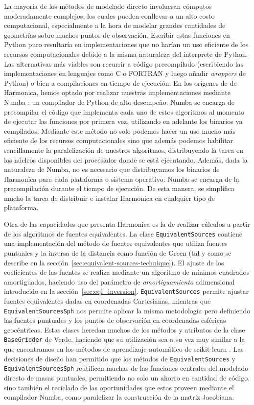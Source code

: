La mayoría de los métodos de modelado directo involucran cómputos moderadamente
complejos, los cuales pueden conllevar a un alto costo computacional,
especialmente a la hora de modelar grandes cantidades de geometrías sobre
muchos puntos de observación.
Escribir estas funciones en Python puro resultaría en implementaciones que no
harían un uso eficiente de los recursos computacionales debido a la misma
naturaleza del interprete de Python.
Las alternativas más viables son recurrir a código precompilado (escribiendo
las implementaciones en lenguajes como C o FORTRAN y luego añadir
\emph{wrappers} de Python) o bien a compilaciones en tiempo de ejecución.
En los orígenes de de Harmonica, hemos optado por realizar nuestras
implementaciones mediante Numba \citep{numba2015}: un compilador de Python de
alto desempeño.
Numba se encarga de precompilar el código que implementa cada uno de estos
algoritmos al momento de ejecutar las funciones por primera vez, utilizando en
adelante los binarios ya compilados.
Mediante este método no solo podemos hacer un uso mucho más eficiente de los
recursos computacionales sino que además podemos habilitar sencillamente la
paralelización de nuestros algoritmos, distribuyendo la tarea en los
núcleos disponibles del procesador donde se está ejecutando.
Además, dada la naturaleza de Numba, no es necesario que distribuyamos los
binarios de Harmonica para cada plataforma o sistema operativo: Numba se
encarga de la precompilación durante el tiempo de ejecución.
De esta manera, se simplifica mucho la tarea de distribuir e instalar
Harmonica en cualquier tipo de plataforma.

Otra de las capacidades que presenta Harmonica es la de realizar cálculos
a partir de los algoritmos de fuentes equivalentes.
La clase \texttt{EquivalentSources} contiene una implementación del método de
fuentes equivalentes que utiliza fuentes puntuales y la inversa de la distancia
como función de Green (tal y como se describe en la
sección~\ref{sec:equivalent-sources-technique}).
El ajuste de los coeficientes de las fuentes se realiza mediante un algoritmo
de mínimos cuadrados amortiguados, haciendo uso del parámetro de
\emph{amortiguamiento} adimensional introducido en la
sección~\ref{sec:eql_inversion}.
\texttt{EquivalentSources} permite ajustar fuentes equivalentes dadas en
coordenadas Cartesianas, mientras que \texttt{EquivalentSourcesSph} nos permite
aplicar la misma metodología pero definiendo las fuentes puntuales y los puntos
de observación en coordenadas esféricas geocéntricas.
Estas clases heredan muchos de los métodos y atributos de la clase
\texttt{BaseGridder} de Verde, haciendo que su utilización sea a su vez
muy similar a la que encontramos en los métodos de aprendizaje automático de
scikit-learn \citep{sklearn2011}.
Las decisiones de diseño han permitido que los métodos de
\texttt{EquivalentSources} y \texttt{EquivalentSourcesSph} reutilicen muchas de
las funciones centrales del modelado directo de masas puntuales, permitiendo no
solo un ahorro en cantidad de código, sino también el reciclado de las
oportunidades que estas proveen mediante el compilador Numba, como paralelizar
la construcción de la matriz Jacobiana.

